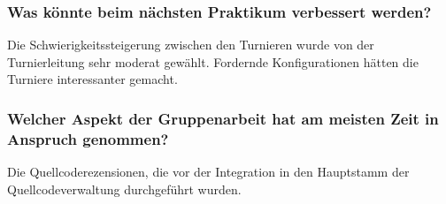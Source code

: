 \documentclass[runningheads]{llncs}
\begin{document}
\subsubsection{Was könnte beim nächsten Praktikum verbessert werden?\\}
Die Schwierigkeitssteigerung zwischen den Turnieren wurde von der Turnierleitung sehr moderat gewählt. Fordernde Konfigurationen hätten die Turniere interessanter gemacht.
\subsubsection{Welcher Aspekt der Gruppenarbeit hat am meisten Zeit in Anspruch genommen?\\}
Die Quellcoderezensionen, die vor der Integration in den Hauptstamm der Quellcodeverwaltung durchgeführt wurden. 
\end{document}
